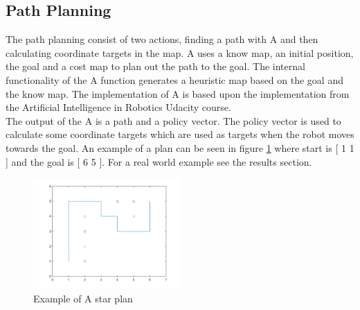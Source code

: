 \subsection{Path Planning}
The path planning consist of two actions, finding a path with A\text{*} and then calculating coordinate targets in the map. 
A\text{*} uses a know map, an initial position, the goal and a cost map to plan out the path to the goal. 
The internal functionality of the A\text{*} function generates a heuristic map based on the goal and the know map. The implementation of A\text{*} is based upon the implementation from the Artificial Intelligence in Robotics Udacity course\citep{AIROK}.\\
The output of the A\text{*} is a path and a policy vector. The policy vector is used to calculate some coordinate targets which are used as targets when the robot moves towards the goal. An example of a plan can be seen in figure \ref{fig:exastar} where start is [ 1 1 ] and the goal is [ 6 5 ]. For a real world example see the results section.
\begin{figure}[H]
\centering
\includegraphics[width=0.5\textwidth]{billeder/exampleastar}
\caption{Example of A star plan}
\label{fig:exastar}
\end{figure}
